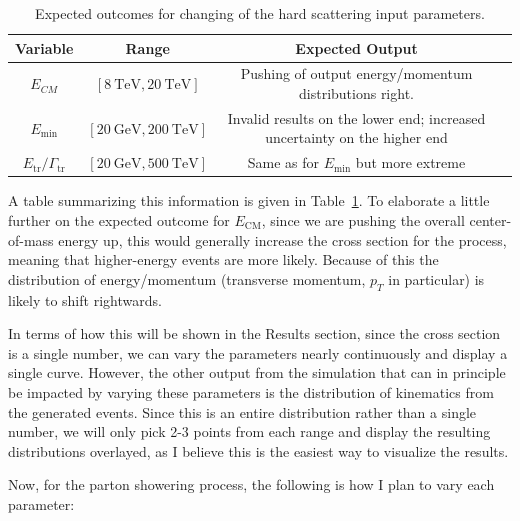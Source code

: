 \begin{center}
  \begin{table}[ht]
    \centering
    \begin{tabular}{|c||c|c|c}
      \hline
      Variable & Range & Expected Output \\ \hline
      $E_{CM}$ & $[\qty{8}{\tera\electronvolt},\qty{20}{\tera\electronvolt}]$ & Pushing of output energy/momentum distributions right. \\ \hline
      $E_{\mathrm{min}}$ & $[\qty{20}{\giga\electronvolt},\qty{200}{\tera\electronvolt}]$ & Invalid results on the lower end; increased uncertainty on the higher end \\ \hline
      $E_{\mathrm{tr}}/\Gamma_{\mathrm{tr}}$ & $[\qty{20}{\giga\electronvolt},\qty{500}{\tera\electronvolt}]$ & Same as for $E_{\mathrm{min}}$ but more extreme \\ \hline
    \end{tabular}
    \caption{Expected outcomes for changing of the hard scattering input parameters.}
    \label{tbl:hard-scattering-vars}
  \end{table}
\end{center}

A table summarizing this information is given in Table~\ref{tbl:hard-scattering-vars}. To elaborate a little further on the expected outcome for $E_{\mathrm{CM}}$, since we are pushing the overall center-of-mass energy up, this would generally increase the cross section for the process, meaning that higher-energy events are more likely. Because of this the distribution of energy/momentum (transverse momentum, $p_T$ in particular) is likely to shift rightwards.

In terms of how this will be shown in the Results section, since the cross section is a single number, we can vary the parameters nearly continuously and display a single curve. However, the other output from the simulation that can in principle be impacted by varying these parameters is the distribution of kinematics from the generated events. Since this is an entire distribution rather than a single number, we will only pick 2-3 points from each range and display the resulting distributions overlayed, as I believe this is the easiest way to visualize the results.

Now, for the parton showering process, the following is how I plan to vary each parameter:

